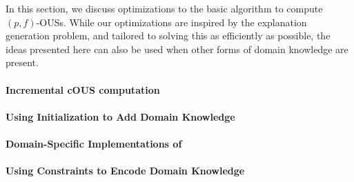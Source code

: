 In this section, we discuss optimizations to the basic algorithm to compute $(p,f)$-OUSs. 
While our optimizations are inspired by the explanation generation problem, and tailored to solving this as efficiently as possible, the ideas presented here can also be used when other forms of domain knowledge are present.  


\paragraph{Incremental cOUS computation}


\paragraph{Using Initialization to Add Domain Knowledge}



\paragraph{Domain-Specific Implementations of \grow}


\paragraph{Using Constraints to Encode Domain Knowledge}

